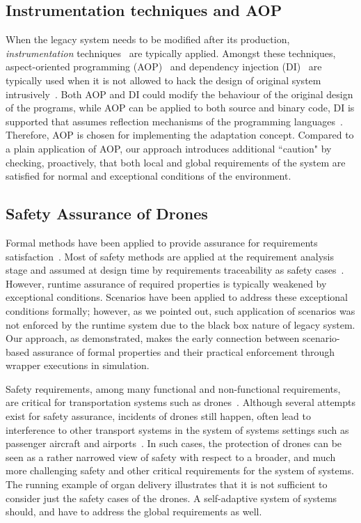 \subsection{Instrumentation techniques and AOP}
When the legacy system needs to be modified after its production, {\em instrumentation} techniques~\cite{instrumentation} are typically applied. Amongst these techniques, aspect-oriented programming (AOP)~\cite{Kiczales:2001} and dependency injection (DI)~\cite{fowlerioc} are typically used when it is not allowed to hack the design of original system intrusively~\cite{hacking}. Both AOP and DI could modify the behaviour of the original design of the programs, while AOP can be applied to both source and binary code, DI is supported that assumes reflection mechanisms of the programming languages~\cite{AOPvsDI}. Therefore, AOP is chosen for implementing the adaptation concept. Compared to a plain application of AOP, our approach introduces additional ``caution" by checking, proactively, that both local and global requirements of the system are satisfied for normal and exceptional conditions of the environment. 

\subsection{Safety Assurance of Drones}
Formal methods have been applied to provide assurance for requirements satisfaction~\cite{FM}. Most of safety methods are applied at the requirement analysis stage and assumed at design time by requirements traceability as safety cases~\cite{traceability}. However, runtime assurance of required properties is typically weakened by exceptional conditions. Scenarios have been applied to address these exceptional conditions formally; however, as we pointed out, such application of scenarios was not enforced by the runtime system due to the black box nature of legacy system. Our approach, as demonstrated, makes the early connection between scenario-based assurance of formal properties and their practical enforcement through wrapper executions in simulation.

Safety requirements, among many functional and non-functional requirements, are critical for transportation systems such as drones~\cite{Survey}. Although several attempts exist for safety assurance, incidents of drones still happen, often lead to interference to other transport systems in the system of systems settings such as passenger aircraft and airports~\cite{GatwickIncident}. In such cases, the protection of drones can be seen as a rather narrowed view of safety with respect to a broader, and much more challenging safety and other critical requirements for the system of systems. The running example of organ delivery illustrates that it is not sufficient to consider just the safety cases of the drones. A self-adaptive system of systems should, and have to address the global requirements as well.

